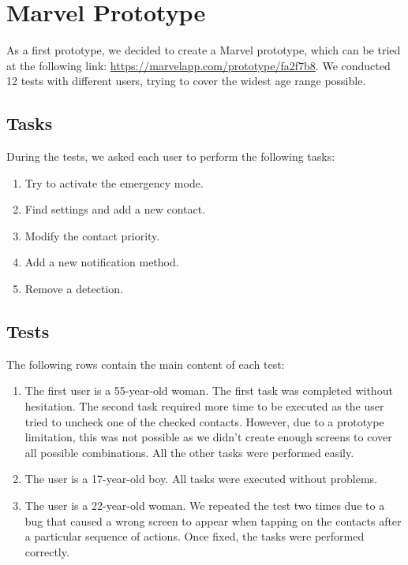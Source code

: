 \documentclass[12pt]{article}
\begin{document}
\section{Marvel Prototype}
As a first prototype, we decided to create a Marvel prototype, which can be tried 
at the following link: \url{https://marvelapp.com/prototype/fa2f7b8}. 
We conducted 12 tests with different users, trying to cover the widest 
age range possible. 

\subsection{Tasks}
During the tests, we asked each user to perform the following tasks:
\begin{enumerate}
    \item Try to activate the emergency mode. 
    \item Find settings and add a new contact.
    \item Modify the contact priority.
    \item Add a new notification method.
    \item Remove a detection.
\end{enumerate}

\subsection{Tests}
The following rows contain the main content of each test:
\begin{enumerate}
    \item The first user is a 55-year-old woman. The first task was completed 
    without hesitation. The second task required more time to be 
    executed as the user tried to uncheck one of the checked contacts. 
    However, due to a prototype limitation, this was not possible as we 
    didn't create enough screens to cover all possible combinations. 
    All the other tasks were performed easily. 

    \item The user is a 17-year-old boy. All tasks were executed 
    without problems. 

    \item The user is a 22-year-old woman. We repeated the test two times 
    due to a bug that caused a wrong screen to appear when tapping on the contacts after a particular sequence of actions. Once fixed, the tasks 
    were performed correctly. 
\end{enumerate}
\end{document}
